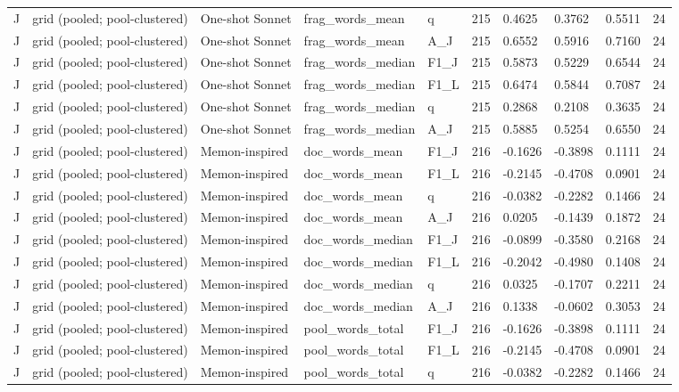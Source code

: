 \begin{table}[t]
{\begin{tabular}{llllllllll}
J & grid (pooled; pool-clustered) & One-shot Sonnet & frag\_words\_mean & q & 215 & 0.4625 & 0.3762 & 0.5511 & 24 \\
J & grid (pooled; pool-clustered) & One-shot Sonnet & frag\_words\_mean & A\_J & 215 & 0.6552 & 0.5916 & 0.7160 & 24 \\
J & grid (pooled; pool-clustered) & One-shot Sonnet & frag\_words\_median & F1\_J & 215 & 0.5873 & 0.5229 & 0.6544 & 24 \\
J & grid (pooled; pool-clustered) & One-shot Sonnet & frag\_words\_median & F1\_L & 215 & 0.6474 & 0.5844 & 0.7087 & 24 \\
J & grid (pooled; pool-clustered) & One-shot Sonnet & frag\_words\_median & q & 215 & 0.2868 & 0.2108 & 0.3635 & 24 \\
J & grid (pooled; pool-clustered) & One-shot Sonnet & frag\_words\_median & A\_J & 215 & 0.5885 & 0.5254 & 0.6550 & 24 \\
J & grid (pooled; pool-clustered) & Memon-inspired & doc\_words\_mean & F1\_J & 216 & -0.1626 & -0.3898 & 0.1111 & 24 \\
J & grid (pooled; pool-clustered) & Memon-inspired & doc\_words\_mean & F1\_L & 216 & -0.2145 & -0.4708 & 0.0901 & 24 \\
J & grid (pooled; pool-clustered) & Memon-inspired & doc\_words\_mean & q & 216 & -0.0382 & -0.2282 & 0.1466 & 24 \\
J & grid (pooled; pool-clustered) & Memon-inspired & doc\_words\_mean & A\_J & 216 & 0.0205 & -0.1439 & 0.1872 & 24 \\
J & grid (pooled; pool-clustered) & Memon-inspired & doc\_words\_median & F1\_J & 216 & -0.0899 & -0.3580 & 0.2168 & 24 \\
J & grid (pooled; pool-clustered) & Memon-inspired & doc\_words\_median & F1\_L & 216 & -0.2042 & -0.4980 & 0.1408 & 24 \\
J & grid (pooled; pool-clustered) & Memon-inspired & doc\_words\_median & q & 216 & 0.0325 & -0.1707 & 0.2211 & 24 \\
J & grid (pooled; pool-clustered) & Memon-inspired & doc\_words\_median & A\_J & 216 & 0.1338 & -0.0602 & 0.3053 & 24 \\
J & grid (pooled; pool-clustered) & Memon-inspired & pool\_words\_total & F1\_J & 216 & -0.1626 & -0.3898 & 0.1111 & 24 \\
J & grid (pooled; pool-clustered) & Memon-inspired & pool\_words\_total & F1\_L & 216 & -0.2145 & -0.4708 & 0.0901 & 24 \\
J & grid (pooled; pool-clustered) & Memon-inspired & pool\_words\_total & q & 216 & -0.0382 & -0.2282 & 0.1466 & 24 \\

\end{tabular}}
\end{table}
